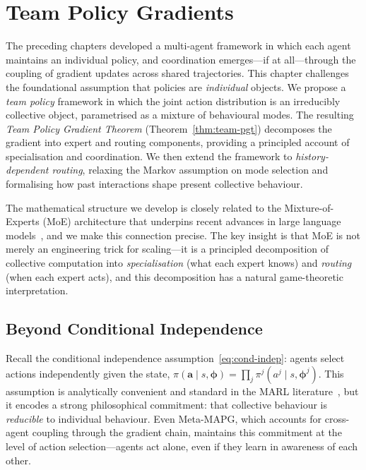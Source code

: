 
\chapter{Team Policy Gradients}
\label{ch:team-pg}

The preceding chapters developed a multi-agent framework in which each agent maintains an individual policy, and coordination emerges---if at all---through the coupling of gradient updates across shared trajectories. This chapter challenges the foundational assumption that policies are \emph{individual} objects. We propose a \emph{team policy} framework in which the joint action distribution is an irreducibly collective object, parametrised as a mixture of behavioural modes. The resulting \emph{Team Policy Gradient Theorem} (Theorem~\ref{thm:team-pgt}) decomposes the gradient into expert and routing components, providing a principled account of specialisation and coordination. We then extend the framework to \emph{history-dependent routing}, relaxing the Markov assumption on mode selection and formalising how past interactions shape present collective behaviour.

The mathematical structure we develop is closely related to the Mixture-of-Experts (MoE) architecture that underpins recent advances in large language models~\cite{shazeer2017,deepseekv3}, and we make this connection precise. The key insight is that MoE is not merely an engineering trick for scaling---it is a principled decomposition of collective computation into \emph{specialisation} (what each expert knows) and \emph{routing} (when each expert acts), and this decomposition has a natural game-theoretic interpretation.

\section{Beyond Conditional Independence}
\label{sec:beyond-cond-indep}

Recall the conditional independence assumption~\eqref{eq:cond-indep}: agents select actions independently given the state, $\pi(\bm{a}\mid s,\bm{\phi})=\prod_j\pi^j(a^j\mid s,\bm{\phi}^j)$. This assumption is analytically convenient and standard in the MARL literature~\cite{lowe2017,kim2021policygradientalgorithmlearning}, but it encodes a strong philosophical commitment: that collective behaviour is \emph{reducible} to individual behaviour. Even Meta-MAPG, which accounts for cross-agent coupling through the gradient chain, maintains this commitment at the level of action selection---agents act alone, even if they learn in awareness of each other.

